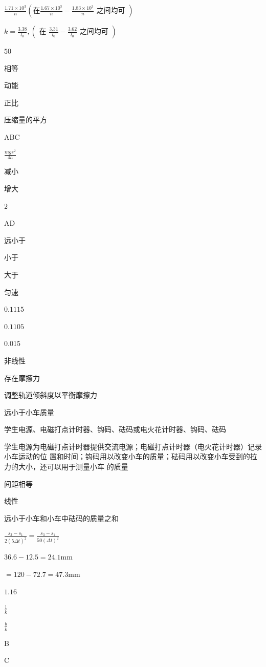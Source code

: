 \item $\frac {1.71 \times 10^{3}}{n}$$\left (\text {在} \frac {1.67 \times 10^{3}}{n}-\frac {1.83 \times 10^{3}}{n} \text { 之间均可 }\right )$
\item $k=\frac {3.38}{l_{0}},\left (\text { 在 } \frac {3.31}{l_{0}}-\frac {3.62}{l_{0}} \text { 之间均可 }\right )$
\item $ 50 $
\item 相等
\item 动能
\item 正比
\item 压缩量的平方
\item ABC
\item $\frac {m g s^{2}}{4 h}$
\item 减小
\item 增大
\item $ 2 $
\item AD
\item 远小于
\item 小于
\item 大于
\item 匀速
\item $ 0.1115 $
\item $ 0.1105 $
\item 0.015
\item 非线性
\item 存在摩擦力
\item 调整轨道倾斜度以平衡摩擦力
\item 远小于小车质量
\item 学生电源、电磁打点计时器、钩码、砝码或电火花计时器、钩码、砝码
\item 学生电源为电磁打点计时器提供交流电源；电磁打点计时器（电火花计时器）记录小车运动的位 置和时间；钩码用以改变小车的质量；砝码用以改变小车受到的拉力的大小，还可以用于测量小车 的质量
\item 间距相等
\item 线性
\item 远小于小车和小车中砝码的质量之和
\item $\frac {s_{3}-s_{1}}{2(5 \Delta t)^{2}}=\frac {s_{3}-s_{1}}{50(\Delta t)^{2}}$
\item $36.6-12.5=24.1 \mathrm {mm}$
\item $=120-72.7=47.3 \mathrm {mm}$
\item $ 1.16 $
\item $ \frac {1}{k} $
\item $ \frac {b}{k} $
\item B
\item C
$$
